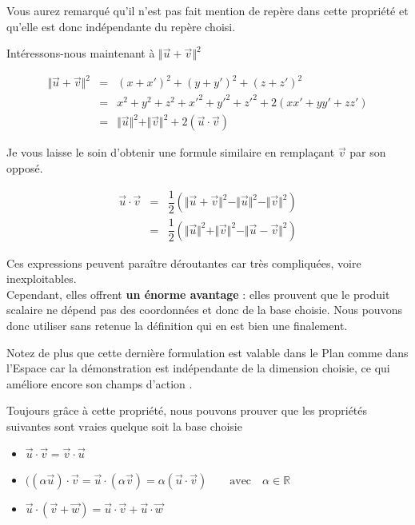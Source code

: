 \documentclass[french]{book}
\newcommand{\fr}[2]{\dfrac{#1}{#2}}
\newcommand{\ve}[1]{\overrightarrow{#1}}
\newcommand{\pa}[1]{(#1)}
\newcommand{\bbr}{\mathbb{R}}
\newcommand{\al}{\alpha}
\newcommand{\nor}[1]{ \Vert #1 \Vert}
\begin{document}
Vous aurez remarqué qu'il n'est pas fait mention de repère dans
cette propriété et qu'elle est donc indépendante du repère choisi.

Intéressons-nous maintenant à $\nor{\ve{u}+\ve{v}}^2$

\begin{eqnarray*}
\nor{\ve{u}+\ve{v}}^2 &=& (x+x')^2+(y+y')^2+(z+z')^2\\
                    &=&
                    x^2+y^2+z^2+x'^2+y'^2+z'^2+2(xx'+yy'+zz')\\
                    &=&
                    \nor{\ve{u}}^2+\nor{\ve{v}}^2+2(\ve{u}\cdot\ve{v})
\end{eqnarray*}

Je vous laisse le soin d'obtenir une formule similaire en
remplaçant $\ve{v}$ par son opposé.



\begin{prop}\label{psnorme}
  \begin{eqnarray*} \ve{u}\cdot\ve{v} &=&
\fr{1}{2}\pa{\nor{\ve{u}+\ve{v}}^2-\nor{\ve{u}}^2-\nor{\ve{v}}^2}\\
&=& \fr{1}{2}\pa{\nor{\ve{u}}^2+\nor{\ve{v}}^2-\nor{\ve{u}-\ve{v}}^2}
\end{eqnarray*}
\end{prop}




Ces expressions peuvent paraître déroutantes car très compliquées, voire
inexploitables. \\
 Cependant, elles  offrent  \textbf{ un énorme  avantage} :  elles
prouvent que le  produit scalaire ne dépend pas  des coordonnées et donc
de  la  base  choisie.  Nous  pouvons  donc  utiliser  sans  retenue  la
définition qui  en est  bien une finalement.

Notez de  plus que cette dernière  formulation est valable  dans le Plan
comme  dans  l'Espace  car  la  démonstration  est  indépendante  de  la
\og dimension\fg{}    choisie,  ce   qui  améliore   encore   son  \og champs
d'action\fg{} .  



Toujours  grâce  à  cette   propriété,  nous  pouvons  prouver  que  les
propriétés suivantes sont vraies quelque soit la base choisie 

\begin{prop}
\begin{itemize}
\item $\ve{u}\cdot\ve{v}=\ve{v}\cdot\ve{u}$ 
\item $(\pa{\alpha\ve{u}}\cdot\ve{v}=\ve{u}\cdot\pa{\al\ve{v}}=\al\pa{\ve{u}\cdot\ve{v}}\qquad\text{avec
}\quad \al\in\bbr$
\item $\ve{u}\cdot\pa{\ve{v}+\ve{w}}=\ve{u}\cdot\ve{v}+\ve{u}\cdot\ve{w}$
\end{itemize}
\end{prop}
\end{document}
